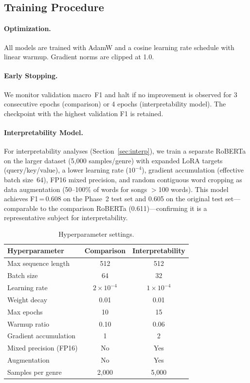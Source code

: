 \documentclass[11pt,a4paper]{article}
\begin{document}
\subsection{Training Procedure}

\paragraph{Optimization.}
All models are trained with AdamW \citep{loshchilov2019decoupled}
and a cosine learning rate schedule with linear warmup.
Gradient norms are clipped at 1.0.

\paragraph{Early Stopping.}
We monitor validation macro~F1 and halt if no improvement is observed
for 3 consecutive epochs (comparison) or 4 epochs (interpretability
model).
The checkpoint with the highest validation F1 is retained.

\paragraph{Interpretability Model.}
For interpretability analyses (Section~\ref{sec:interp}), we train a
separate RoBERTa on the larger dataset (5{,}000 samples/genre) with
expanded LoRA targets (query/key/value), a lower learning rate
($10^{-4}$), gradient accumulation (effective batch size~64), FP16
mixed precision, and random contiguous word cropping as data
augmentation (50--100\% of words for songs $>$100 words).
This model achieves F1\,=\,0.608 on the Phase~2 test set and
0.605 on the original test set---comparable to the comparison
RoBERTa (0.611)---confirming it is a representative subject for
interpretability.

\begin{table}[ht]
\centering
\caption{Hyperparameter settings.}
\label{tab:hyperparams}
\begin{tabular}{lcc}
\toprule
\textbf{Hyperparameter} & \textbf{Comparison} &
\textbf{Interpretability} \\
\midrule
Max sequence length & 512 & 512 \\
Batch size & 64 & 32 \\
Learning rate & $2 \times 10^{-4}$ & $1 \times 10^{-4}$ \\
Weight decay & 0.01 & 0.01 \\
Max epochs & 10 & 15 \\
Warmup ratio & 0.10 & 0.06 \\
Gradient accumulation & 1 & 2 \\
Mixed precision (FP16) & No & Yes \\
Augmentation & No & Yes \\
Samples per genre & 2{,}000 & 5{,}000 \\
\bottomrule
\end{tabular}
\end{table}
\end{document}
